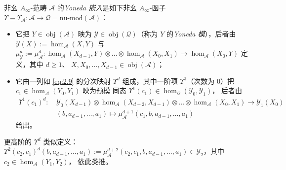 \begin{Def}\label{def:2.35}
非幺 $A_\infty$-范畴 $\mathcal A$ 的\emph{Yoneda 嵌入}是如下非幺
$A_\infty$-函子 $\Upsilon\equiv\Upsilon_{\mathcal A}:\mathcal A\to\mathcal Q=
\mathrm{nu\text{-}mod}(\mathcal A)$：
\begin{itemize}
  \item 它把 $Y\in\operatorname{obj}(\mathcal A)$ 映为 $\mathcal Y\in
        \operatorname{obj}(\mathcal Q)$（称为 $Y$ 的\emph{Yoneda 模}），后者由
        $\mathcal Y(X):=\hom_{\mathcal A}(X,Y)$ 与 $\mu^d_{\mathcal Y}:=
        \mu^d_{\mathcal A}:\hom_{\mathcal A}(X_{d-1},Y)\otimes\dots\otimes
        \hom_{\mathcal A}(X_0,X_1)\to\hom_{\mathcal A}(X_0,Y)$ 定义，其中 $d\ge 1$、
        $X,X_0,\dots,X_{d-1}\in\operatorname{obj}(\mathcal A)$；
  \item 它由一列如 \eqref{eq:2.9} 的分次映射 $\Upsilon^d$ 组成，其中一阶项
        $\Upsilon^1$（次数为 0）把 $c_1\in\hom_{\mathcal A}(Y_0,Y_1)$ 映为预模
        同态 $\Upsilon^1(c_1)\in\hom_{\mathcal Q}(\mathcal Y_0,\mathcal Y_1)$，
        后者由
        \begin{equation}\label{eq:2.30}
          \begin{aligned}
            \Upsilon^1(c_1)^d:\ &\mathcal Y_0(X_{d-1})\otimes\hom_{\mathcal A}
            (X_{d-2},X_{d-1})\otimes\dots\otimes\hom_{\mathcal A}(X_0,X_1)
            \longrightarrow\mathcal Y_1(X_0)\\
            &(b,a_{d-1},\dots,a_1)\longmapsto\mu^{d+1}_{\mathcal A}
            (c_1,b,a_{d-1},\dots,a_1)
          \end{aligned}
        \end{equation}
        给出。
\end{itemize}
\end{Def}

更高阶的 $\Upsilon^d$ 类似定义：
$\Upsilon^2(c_2,c_1)^d(b,a_{d-1},\dots,a_1):=\mu^{d+2}_{\mathcal A}(c_2,c_1,
b,a_{d-1},\dots,a_1)\in\mathcal Y_2$，其中 $c_2\in\hom_{\mathcal A}(Y_1,Y_2)$，
依此类推。

